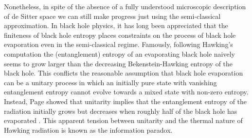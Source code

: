 \documentclass[a4paper,11pt]{article}
\numberwithin{equation}{section}
\begin{document}
Nonetheless, in spite of the absence of a fully understood microscopic description of de Sitter space we can still make progress just using the semi-classical approximation. In black hole physics, it has long been appreciated that the finiteness of black hole entropy places constraints on the process of black hole evaporation even in the semi-classical regime. Famously, following Hawking's computation the (entanglement) entropy of an evaporating black hole naively seems to grow larger than the decreasing Bekenstein-Hawking entropy of the black hole. This conflicts the reasonable assumption that black hole evaporation can be a unitary process in which an initially pure state with vanishing entanglement entropy cannot evolve towards a mixed state with non-zero entropy. Instead, Page showed that unitarity implies that the entanglement entropy of the radiation initially grows but decreases when roughly half of the black hole has evaporated \cite{Page:1993wv,Page:2013dx}. This apparent tension between unitarity and the thermal nature of Hawking radiation is known as the information paradox.
\end{document}
